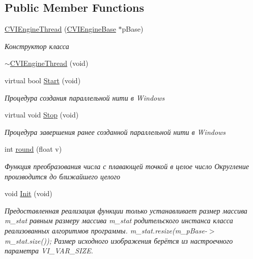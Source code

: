 \subsection*{Public Member Functions}
\begin{DoxyCompactItemize}
\item 
\hyperlink{class_c_v_i_engine_thread_ae988fa69cb7743794ab221309f581d62}{C\+V\+I\+Engine\+Thread} (\hyperlink{class_c_v_i_engine_base}{C\+V\+I\+Engine\+Base} $\ast$p\+Base)
\begin{DoxyCompactList}\small\item\em Конструктор класса \end{DoxyCompactList}\item 
\hyperlink{class_c_v_i_engine_thread_a62a261241845149502fceb9a98f75ce0}{$\sim$\+C\+V\+I\+Engine\+Thread} (void)
\item 
virtual bool \hyperlink{class_c_v_i_engine_thread_a6ce21dad9996e7dba3b23882d010db17}{Start} (void)
\begin{DoxyCompactList}\small\item\em Процедура создания параллельной нити в Windows \end{DoxyCompactList}\item 
virtual void \hyperlink{class_c_v_i_engine_thread_a5a8d55cd216084f924cd75b8ede97fc8}{Stop} (void)
\begin{DoxyCompactList}\small\item\em Процедура завершения ранее созданной параллельной нити в Windows \end{DoxyCompactList}\item 
int \hyperlink{class_c_v_i_engine_thread_ab377abdaf5512ce301f5a5f817a4ec7f}{round} (float v)
\begin{DoxyCompactList}\small\item\em Функция преобразования числа с плавающей точкой в целое число Округление производится до ближайшего целого \end{DoxyCompactList}\item 
void \hyperlink{class_c_v_i_engine_thread_a8bd3c1702025f3db9b6e29c2dcb2b264}{Init} (void)
\begin{DoxyCompactList}\small\item\em Предоставленная реализация функции только устанавливает размер массива m\+\_\+stat равным размеру массива m\+\_\+stat родительского инстанса класса реализованных алгоритмов программы. m\+\_\+stat.\+resize(m\+\_\+p\+Base-\/$>$m\+\_\+stat.\+size()); Размер исходного изображения берётся из настроечного параметра V\+I\+\_\+\+V\+A\+R\+\_\+\+S\+I\+Z\+E. \end{DoxyCompactList}\item 

\end{DoxyCompactItemize}
